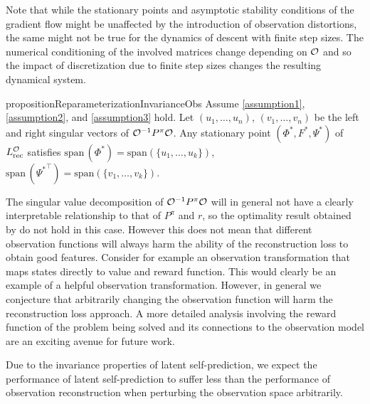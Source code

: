Note that while the stationary points and asymptotic stability conditions of the gradient flow might be unaffected by the introduction of observation distortions, the same might not be true for the dynamics of descent with finite step sizes.
The numerical conditioning of the involved matrices change depending on ${\mathcal{O}}$ and so the impact of discretization due to finite step sizes changes the resulting dynamical system.

\begin{restatable}{proposition}{ReparameterizationInvarianceObs} 
 Assume \autoref{assumption1}, \autoref{assumption2}, and \autoref{assumption3} hold. Let $(u_1,\dots,u_n)$, $(v_1,\dots,v_n)$ be the left and right singular vectors of ${\mathcal{O}}^{-1}P^\pi{\mathcal{O}}$. 
Any stationary point $(\Phi^*, F^*, \Psi^*)$ of $L_\text{rec}^{\mathcal{O}}$ satisfies $\mathrm{span}\,(\Phi^*)=\mathrm{span}\left(\{u_1,\dots,u_k\}\right)$, $\mathrm{span}\,({\Psi^*}^\top)=\mathrm{span}\left(\{v_1,\dots,v_k\}\right)$.
\end{restatable}

The singular value decomposition of ${\mathcal{O}}^{-1}P^\pi{\mathcal{O}}$ will in general not have a clearly interpretable relationship to that of $P^\pi$ and $r$, so the optimality result obtained by \textcite{behzadian2019fast} do not hold in this case.
However this does not mean that different observation functions will always harm the ability of the reconstruction loss to obtain good features.
Consider for example an observation transformation that maps states directly to value and reward function.
This would clearly be an example of a helpful observation transformation.
However, in general we conjecture that arbitrarily changing the observation function will harm the reconstruction loss approach.
A more detailed analysis involving the reward function of the problem being solved and its connections to the observation model are an exciting avenue for future work.

\begin{tcolorbox}[boxrule=0.2mm,colback=white,colframe=uoftblue,boxsep=0pt,top=3pt,bottom=5pt]
\begin{insight} 
\label{insight2}
Due to the invariance properties of latent self-prediction, we expect the performance of latent self-prediction to suffer less than the performance of observation reconstruction when perturbing the observation space arbitrarily.
\end{insight}
\end{tcolorbox}


